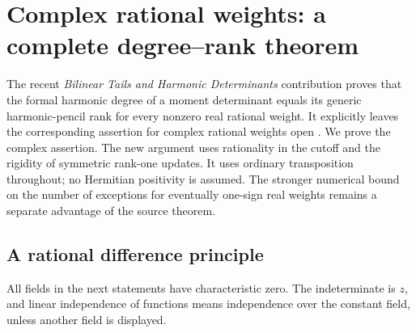 \section{Complex rational weights: a complete degree--rank theorem}
\label{cr:section}

The recent \emph{Bilinear Tails and Harmonic Determinants} contribution
proves that the formal harmonic degree of a moment determinant equals
its generic harmonic-pencil rank for every nonzero real rational weight.
It explicitly leaves the corresponding assertion for complex rational
weights open \cite[Section~5, Corollary \texttt{deg:rational};
Section~10, ``Complex weights and sharp cutoff exceptions'']{BilinearIncoming}.
We prove the complex assertion.  The new argument uses rationality in
the cutoff and the rigidity of symmetric rank-one updates.  It uses
ordinary transposition throughout; no Hermitian positivity is assumed.
The stronger numerical bound on the number of exceptions for eventually
one-sign real weights remains a separate advantage of the source theorem.

\subsection{A rational difference principle}

All fields in the next statements have characteristic zero.  The
indeterminate is $z$, and linear independence of functions means
independence over the constant field, unless another field is displayed.

